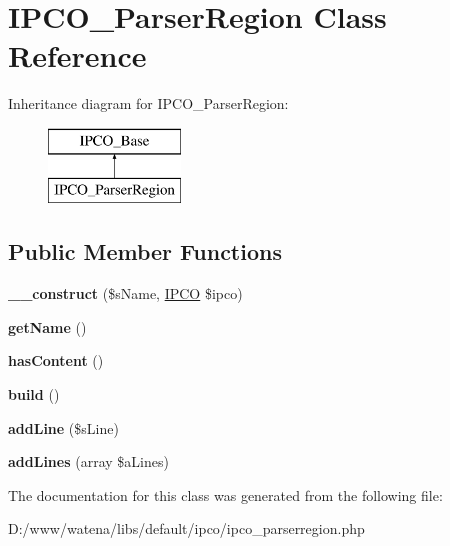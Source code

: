 \hypertarget{class_i_p_c_o___parser_region}{\section{I\-P\-C\-O\-\_\-\-Parser\-Region Class Reference}
\label{class_i_p_c_o___parser_region}
}
Inheritance diagram for I\-P\-C\-O\-\_\-\-Parser\-Region\-:\begin{figure}[H]
\begin{center}
\leavevmode
\includegraphics[height=2.000000cm]{class_i_p_c_o___parser_region}
\end{center}
\end{figure}
\subsection*{Public Member Functions}
\begin{DoxyCompactItemize}
\item 
\hypertarget{class_i_p_c_o___parser_region_a890c154a7b4a6eac13b4524a13c6263c}{{\bfseries \-\_\-\-\_\-construct} (\$s\-Name, \hyperlink{class_i_p_c_o}{I\-P\-C\-O} \$ipco)}\label{class_i_p_c_o___parser_region_a890c154a7b4a6eac13b4524a13c6263c}

\item 
\hypertarget{class_i_p_c_o___parser_region_a79b3c0bd77bec4fadf90de98d1df4c84}{{\bfseries get\-Name} ()}\label{class_i_p_c_o___parser_region_a79b3c0bd77bec4fadf90de98d1df4c84}

\item 
\hypertarget{class_i_p_c_o___parser_region_a6e5c002774eb707467e2619a20b7166c}{{\bfseries has\-Content} ()}\label{class_i_p_c_o___parser_region_a6e5c002774eb707467e2619a20b7166c}

\item 
\hypertarget{class_i_p_c_o___parser_region_a4aeec6cbfb38787ffa07582560ff1d6f}{{\bfseries build} ()}\label{class_i_p_c_o___parser_region_a4aeec6cbfb38787ffa07582560ff1d6f}

\item 
\hypertarget{class_i_p_c_o___parser_region_a722bca13b270837482c92269e42d0966}{{\bfseries add\-Line} (\$s\-Line)}\label{class_i_p_c_o___parser_region_a722bca13b270837482c92269e42d0966}

\item 
\hypertarget{class_i_p_c_o___parser_region_a7913a7d0b9ba61aa831ac5b31a288fb5}{{\bfseries add\-Lines} (array \$a\-Lines)}\label{class_i_p_c_o___parser_region_a7913a7d0b9ba61aa831ac5b31a288fb5}

\end{DoxyCompactItemize}


The documentation for this class was generated from the following file\-:\begin{DoxyCompactItemize}
\item 
D\-:/www/watena/libs/default/ipco/ipco\-\_\-parserregion.\-php\end{DoxyCompactItemize}
